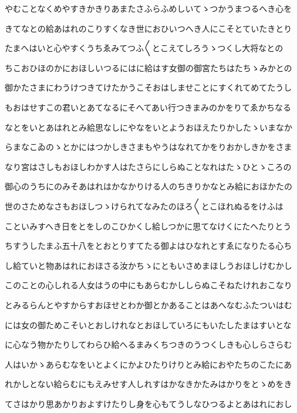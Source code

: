 \documentclass[a4paper,11pt,landscape]{ltjtarticle}
\begin{document}
\par\medskip
やむことなくめやすきかきりあまたさふらふめしいてゝつかうまつるへき心を
\par\medskip
きてなとの給あはれのこりすくなき世におひいつへき人にこそとていたきとり
\par\medskip
たまへはいと心やすくうちゑみてつふ〱とこえてしろうゝつくし大将なとの
\par\medskip
ちこおひほのかにおほしいつるにはに給はす女御の御宮たちはたちゝみかとの
\par\medskip
御かたさまにわうけつきてけたかうこそおはしませことにすくれてめてたうし
\par\medskip
もおはせすこの君いとあてなるにそへてあい行つきまみのかをりてゑかちなる
\par\medskip
なとをいとあはれとみ給思なしにやなをいとようおほえたりかしたゝいまなか
\par\medskip
らまなこゐのゝとかにはつかしきさまもやうはなれてかをりおかしきかをさま
\par\medskip
なり宮はさしもおほしわかす人はたさらにしらぬことなれはたゝひとゝころの
\par\medskip
御心のうちにのみそあはれはかなかりける人のちきりかなとみ給におほかたの
\par\medskip
世のさためなさもおほしつゝけられてなみたのほろ〱とこほれぬるをけふは
\par\medskip
こといみすへき日をとをしのこひかくし給しつかに思てなけくにたへたりとう
\par\medskip
ちすうしたまふ五十八をとおとりすてたる御よはひなれとすゑになりたる心ち
\par\medskip
し給ていと物あはれにおほさる汝かちゝにともいさめまほしうおほしけむかし
\par\medskip
このことの心しれる人女はうの中にもあらむかししらぬこそねたけれおこなり
\par\medskip
とみるらんとやすからすおほせとわか御とかあることはあへなむふたついはむ
\par\medskip
には女の御ためこそいとおしけれなとおほしていろにもいたしたまはすいとな
\par\medskip
に心なう物かたりしてわらひ給へるまみくちつきのうつくしきも心しらさらむ
\par\medskip
人はいかゝあらむなをいとよくにかよひたりけりとみ給におやたちのこたにあ
\par\medskip
れかしとない給らむにもえみせす人しれすはかなきかたみはかりをとゝめをき
\par\medskip
てさはかり思あかりおよすけたりし身を心もてうしなひつるよとあはれにおし
\end{document}
